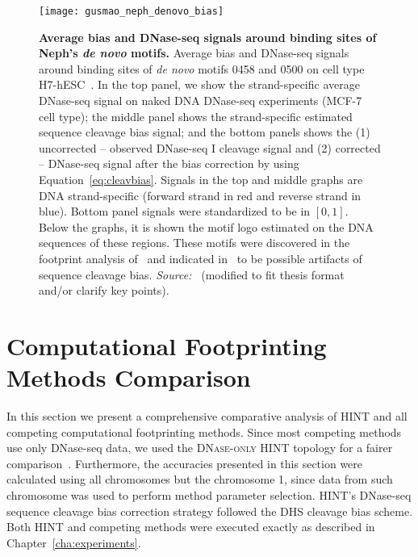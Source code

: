 \begin{figure}[h!]
\centering
\texttt{[image: gusmao\_neph\_denovo\_bias]}
\caption[Average bias and DNase-seq signals around binding sites of Neph's \emph{de novo} motifs]{\textbf{Average bias and DNase-seq signals around binding sites of Neph's \emph{de novo} motifs.} Average bias and DNase-seq signals around binding sites of \emph{de novo} motifs 0458 and 0500 on cell type H7-hESC~\citep{neph2012a}. In the top panel, we show the strand-specific average DNase-seq signal on naked DNA DNase-seq experiments (MCF-7 cell type); the middle panel shows the strand-specific estimated sequence cleavage bias signal; and the bottom panels shows the (1) uncorrected -- observed DNase-seq I cleavage signal and (2) corrected -- DNase-seq signal after the bias correction by using Equation~\ref{eq:cleavbias}. Signals in the top and middle graphs are DNA strand-specific (forward strand in red and reverse strand in blue). Bottom panel signals were standardized to be in $[0,1]$. Below the graphs, it is shown the motif logo estimated on the DNA sequences of these regions. These motifs were discovered in the footprint analysis of~\cite{neph2012a} and indicated in~\cite{he2014} to be possible artifacts of sequence cleavage bias. \emph{Source:~\cite{gusmao2016}} (modified to fit thesis format and/or clarify key points).}
\label{fig:gusmao_neph_denovo_bias}
\end{figure}

\section{Computational Footprinting Methods Comparison}
\label{sec:computational.footprinting.methods.comparison}

In this section we present a comprehensive comparative analysis of HINT and all competing computational footprinting methods. Since most competing methods use only DNase-seq data, we used the \textsc{DNase-only} HINT topology for a fairer comparison~\cite{rusk2015}. Furthermore, the accuracies presented in this section were calculated using all chromosomes but the chromosome 1, since data from such chromosome was used to perform method parameter selection. HINT's DNase-seq sequence cleavage bias correction strategy followed the DHS cleavage bias scheme. Both HINT and competing methods were executed exactly as described in Chapter~\ref{cha:experiments}.

